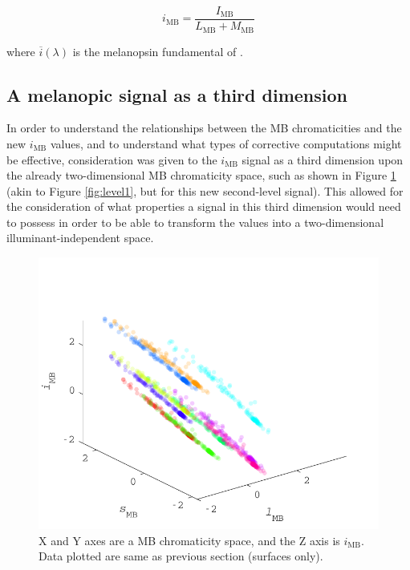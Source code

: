 \begin{equation}
i_{\text{MB}} = \frac{I_{\text{MB}}}{L_{\text{MB}}+M_{\text{MB}}} 
\label{eq:iMB}
\end{equation}

where $\overline{i}(\lambda)$ is the melanopsin fundamental of \citet{lucas_measuring_2014}.


\subsection{A melanopic signal as a third dimension}

In order to understand the relationships between the \gls{MB} chromaticities and the new $i_{\text{MB}}$ values, and to understand what types of corrective computations might be effective, consideration was given to the $i_{\text{MB}}$ signal as a third dimension upon the already two-dimensional \gls{MB} chromaticity space, such as shown in Figure \ref{fig:ZL} (akin to Figure \ref{fig:level1}, but for this new second-level signal). This allowed for the consideration of what properties a signal in this third dimension would need to possess in order to be able to transform the values into a two-dimensional illuminant-independent space.

\begin{figure}[htbp]
 \includegraphics[max width=\textwidth]{figs/comp/thirdDimension/ZL.pdf}
 \caption{X and Y axes are a \gls{MB} chromaticity space, and the Z axis is $i_{\text{MB}}$. Data plotted are same as previous section (surfaces only).}
 \label{fig:ZL}
\end{figure}


